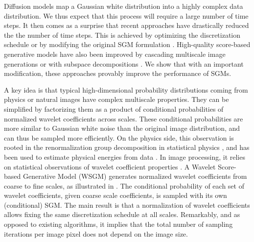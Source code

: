 \documentclass{article}
\begin{document}
Diffusion models map a Gaussian white distribution into a highly
complex data distribution. We thus expect that this process will require a large number of time
steps.  It then comes as a surprise that recent approaches have
drastically reduced the the number of time steps. This is achieved by optimizing the
discretization schedule or by modifying the original SGM formulation
\citep{kadkhodaie2020solving,jolicoeur2021gotta,liu2022pseudo,zhang2022exponential,san2021noise,nachmani2021non,song2020denoising,kong2021fast,ho2020denoising,luhman2021knowledge,salimans2022progressive,xiao2021tackling}.
High-quality score-based generative models have also been improved by cascading
multiscale image generations \citep{saharia2021image, ho2022cascaded,
  nichol2021beatgans} or with subspace decompositions
\citep{jing2022subspace}. We show that with an important modification, these approaches provably improve the performance of SGMs. 

A key idea is that typical high-dimensional probability distributions coming
from physics or natural images have complex multiscale properties. They can be
simplified by factorizing them as a product of conditional probabilities of
normalized wavelet coefficients across scales. These conditional probabilities
are more similar to Gaussian white noise than the original image distribution,
and can thus be sampled more efficiently.  On the physics side, this observation
is rooted in the renormalization group decomposition in statistical physics
\citep{wilson1971renormalization}, and has been used to estimate physical
energies from data \cite{WCRG}. In image processing, it relies on statistical
observations of wavelet coefficient properties \citep{wainwright1999scale}.  A Wavelet Score-based Generative
Model (WSGM) generates normalized wavelet coefficients from coarse to fine
scales, as illustrated in .  The conditional probability of
each set of wavelet coefficients, given coarse scale coefficients, is sampled
with its own (conditional) SGM. The main result is that a normalization of
wavelet coefficients allows fixing the same  discretization schedule at all
scales. Remarkably, and as opposed to existing algorithms, it implies that the
total number of sampling iterations per image pixel does not depend on the image
size.
\end{document}
